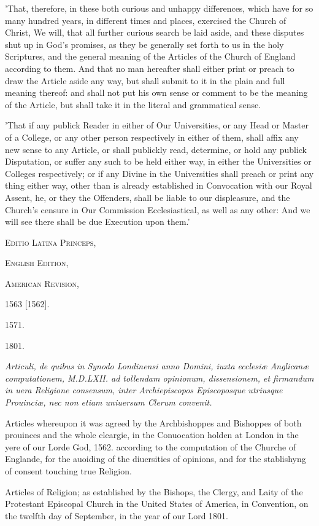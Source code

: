'That, therefore, in these both curious and unhappy differences, which have for so many hundred years, in different times and places, exercised the Church of Christ, We will, that all further curious search be laid aside, and these disputes shut up in God's promises, as they be generally set forth to us in the holy Scriptures, and the general meaning of the Articles of the Church of England according to them. And that no man hereafter shall either print or preach to draw the Article aside any way, but shall submit to it in the plain and full meaning thereof: and shall not put his own sense or comment to be the meaning of the Article, but shall take it in the literal and grammatical sense.

'That if any publick Reader in either of Our Universities, or any Head or Master of a College, or any other person respectively in either of them, shall affix any new sense to any Article, or shall publickly read, determine, or hold any publick Disputation, or suffer any such to be held either way, in either the Universities or Colleges respectively; or if any Divine in the Universities shall preach or print any thing either way, other than is already established in Convocation with our Royal Assent, he, or they the Offenders, shall be liable to our displeasure, and the Church's censure in Our Commission Ecclesiastical, as well as any other: And we will see there shall be due Execution upon them.'

E\textsc{ditio} L\textsc{atina} P\textsc{rinceps},

E\textsc{nglish} E\textsc{dition},

A\textsc{merican} R\textsc{evision},

1563 [1562].

1571.

1801.

\emph{Articuli, de quibus in Synodo Londinensi anno Domini, iuxta ecclesiæ Anglicanæ computationem, M.D.LXII. ad tollendam opinionum, dissensionem, et firmandum in uera Religione consensum, inter Archiepiscopos Episcoposque utriusque Prouinciæ, nec non etiam uniuersum Clerum convenit.}

Articles whereupon it was agreed by the Archbishoppes and Bishoppes of both prouinces and the whole cleargie, in the Conuocation holden at London in the yere of our Lorde God, 1562. according to the computation of the Churche of Englande, for the auoiding of the diuersities of opinions, and for the stablishyng of consent touching true Religion.

Articles of Religion; as established by the Bishops, the Clergy, and Laity of the Protestant Episcopal Church in the United States of America, in Convention, on the twelfth day of September, in the year of our Lord 1801.

